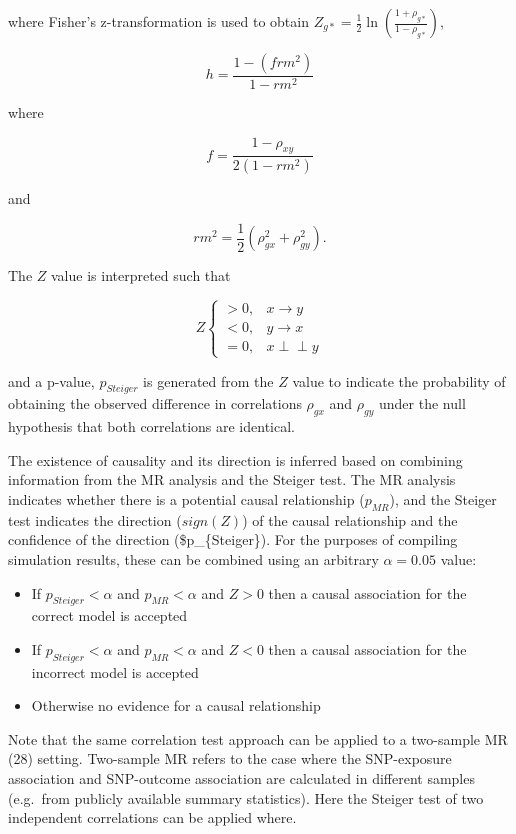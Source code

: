 \documentclass[]{article}
\providecommand{\tightlist}{%
  \setlength{\itemsep}{0pt}\setlength{\parskip}{0pt}}
\begin{document}
where Fisher's z-transformation is used to obtain
\(Z_{g*} = \frac{1}{2} \ln \left ( \frac{1+\rho_{g*}}{1-\rho_{g*}} \right )\),

\[
h = \frac{1 - (frm^2)} {1 - rm^2}
\]

where

\[
f = \frac{1 - \rho_{xy}}{2(1 - rm^2)}
\]

and

\[
rm^2 = \frac{1}{2}(\rho_{gx}^2 + \rho_{gy}^2).
\]

The \(Z\) value is interpreted such that

\[
Z \left\{
\begin{array}{ll}
> 0, & x \to y\\
< 0, & y \to x\\
= 0, & x \perp\!\!\!\perp y 
\end{array} \right.
\]

and a p-value, \(p_{Steiger}\) is generated from the \(Z\) value to
indicate the probability of obtaining the observed difference in
correlations \(\rho_{gx}\) and \(\rho_{gy}\) under the null hypothesis
that both correlations are identical.

The existence of causality and its direction is inferred based on
combining information from the MR analysis and the Steiger test. The MR
analysis indicates whether there is a potential causal relationship
(\(p_{MR}\)), and the Steiger test indicates the direction (\(sign(Z)\))
of the causal relationship and the confidence of the direction
(\$p\_\{Steiger\}). For the purposes of compiling simulation results,
these can be combined using an arbitrary \(\alpha = 0.05\) value:

\begin{itemize}
\tightlist
\item
  If \(p_{Steiger} < \alpha\) and \(p_{MR} < \alpha\) and \(Z > 0\) then
  a causal association for the correct model is accepted
\item
  If \(p_{Steiger} < \alpha\) and \(p_{MR} < \alpha\) and \(Z < 0\) then
  a causal association for the incorrect model is accepted
\item
  Otherwise no evidence for a causal relationship
\end{itemize}

Note that the same correlation test approach can be applied to a
two-sample MR (28) setting. Two-sample MR refers to the case where the
SNP-exposure association and SNP-outcome association are calculated in
different samples (e.g.~from publicly available summary statistics).
Here the Steiger test of two independent correlations can be applied
where.
\end{document}

